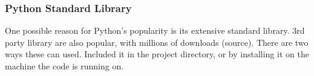 \documentclass[12pt, titlepage]{article}
\begin{document}
\subsubsection{Python Standard Library}
One possible reason for Python's popularity is its extensive standard library. 3rd party library are also popular, with millions of downloads (source). There are two ways these can used. Included it in the project directory, or by installing it on the machine the code is running on.
\newpage


{}

\end{document}
